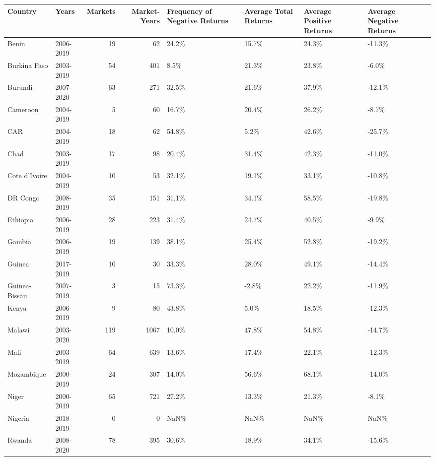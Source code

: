 \begin{table}[ht]
\centering
\begin{tabular}{llrrllll}
  \hline
Country & Years & Markets & Market-Years & Frequency of Negative Returns & Average Total Returns & Average Positive Returns & Average Negative Returns \\ 
  \hline
Benin & 2006-2019 &  19 &  62 & 24.2\% & 15.7\% & 24.3\% & -11.3\% \\ 
  Burkina Faso & 2003-2019 &  54 & 401 & 8.5\% & 21.3\% & 23.8\% & -6.0\% \\ 
  Burundi & 2007-2020 &  63 & 271 & 32.5\% & 21.6\% & 37.9\% & -12.1\% \\ 
  Cameroon & 2004-2019 &   5 &  60 & 16.7\% & 20.4\% & 26.2\% & -8.7\% \\ 
  CAR & 2004-2019 &  18 &  62 & 54.8\% & 5.2\% & 42.6\% & -25.7\% \\ 
  Chad & 2003-2019 &  17 &  98 & 20.4\% & 31.4\% & 42.3\% & -11.0\% \\ 
  Cote d'Ivoire & 2004-2019 &  10 &  53 & 32.1\% & 19.1\% & 33.1\% & -10.8\% \\ 
  DR Congo & 2008-2019 &  35 & 151 & 31.1\% & 34.1\% & 58.5\% & -19.8\% \\ 
  Ethiopia & 2006-2019 &  28 & 223 & 31.4\% & 24.7\% & 40.5\% & -9.9\% \\ 
  Gambia & 2006-2019 &  19 & 139 & 38.1\% & 25.4\% & 52.8\% & -19.2\% \\ 
  Guinea & 2017-2019 &  10 &  30 & 33.3\% & 28.0\% & 49.1\% & -14.4\% \\ 
  Guinea-Bissau & 2007-2019 &   3 &  15 & 73.3\% & -2.8\% & 22.2\% & -11.9\% \\ 
  Kenya & 2006-2019 &   9 &  80 & 43.8\% & 5.0\% & 18.5\% & -12.3\% \\ 
  Malawi & 2003-2020 & 119 & 1067 & 10.0\% & 47.8\% & 54.8\% & -14.7\% \\ 
  Mali & 2003-2019 &  64 & 639 & 13.6\% & 17.4\% & 22.1\% & -12.3\% \\ 
  Mozambique & 2000-2019 &  24 & 307 & 14.0\% & 56.6\% & 68.1\% & -14.0\% \\ 
  Niger & 2000-2019 &  65 & 721 & 27.2\% & 13.3\% & 21.3\% & -8.1\% \\ 
  Nigeria & 2018-2019 &   0 &   0 & NaN\% & NaN\% & NaN\% & NaN\% \\ 
  Rwanda & 2008-2020 &  78 & 395 & 30.6\% & 18.9\% & 34.1\% & -15.6\% \\ 

\end{tabular}
\end{table}
